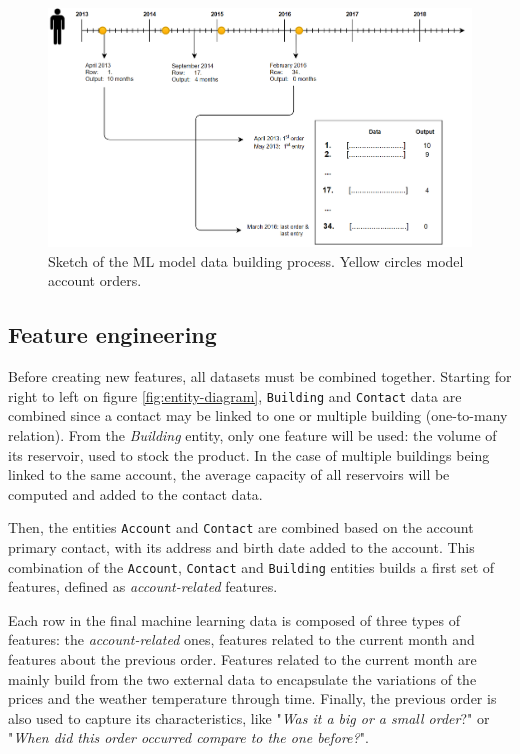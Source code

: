 \begin{figure}[h]
    \centering
    \includegraphics[width=14cm]{images/data-build-ml-example.png}
    \caption[Process to build data for machine learning]{Sketch of the ML model data building process. Yellow circles model account orders.}
    \label{fig:data-build-example}
\end{figure}


\subsection{Feature engineering}\label{sec:ml-features}

Before creating new features, all datasets must be combined together. Starting for right to left on figure \ref{fig:entity-diagram}, \texttt{Building} and \texttt{Contact} data are combined since a contact may be linked to one or multiple building (one-to-many relation). From the \textit{Building} entity, only one feature will be used: the volume of its reservoir, used to stock the product. In the case of multiple buildings being linked to the same account, the average capacity of all reservoirs will be computed and added to the contact data. 

Then, the entities \texttt{Account} and \texttt{Contact} are combined based on the account primary contact, with its address and birth date added to the account. This combination of the \texttt{Account}, \texttt{Contact} and \texttt{Building} entities builds a first set of features, defined as \textit{account-related} features.

Each row in the final machine learning data is composed of three types of features: the \textit{account-related} ones, features related to the current month and features about the previous order. Features related to the current month are mainly build from the two external data to encapsulate the variations of the prices and the weather temperature through time. Finally, the previous order is also used to capture its characteristics, like "\textit{Was it a big or a small order}?" or "\textit{When did this order occurred compare to the one before?}".


